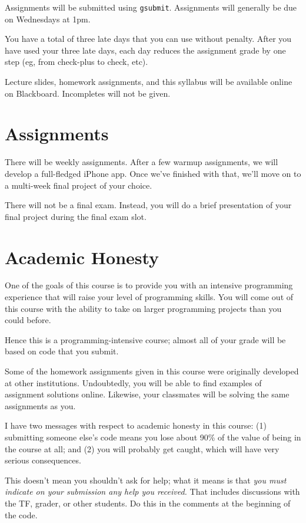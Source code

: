 \documentclass[11pt]{article}
\begin{document}
Assignments will be submitted using \texttt{gsubmit}.   Assignments will
generally be due on Wednesdays at 1pm.

You have a total of three late days that you can use without penalty.
After you have used your three late days, each day reduces the
assignment grade by one step (eg, from check-plus to check, etc).

\sloppypar
Lecture slides, homework assignments, and this syllabus will be available
online on Blackboard.  Incompletes will not be given. 

\section*{Assignments}

There will be weekly assignments.   After a few warmup assignments, we
will develop a full-fledged iPhone app.  Once we've finished with that,
we'll move on to a multi-week final project of your choice.

There will not be a final exam.  Instead, you will do a brief
presentation of your final project during the final exam slot.

\section*{Academic Honesty}
One of the goals of this course is to provide you with an intensive
programming experience that will raise your level of programming
skills.  You will come out of this course with the ability to take on
larger programming projects than you could before.  

Hence this is a programming-intensive course;  almost all of your grade will
be based on code that you submit.   

Some of the homework assignments given in this course were originally developed
at other institutions.  Undoubtedly, you will be able to find examples of
assignment solutions online.   Likewise, your classmates will be solving
the same assignments as you.

I have two messages with respect to academic honesty in this course: (1)
submitting someone else's code means you lose about 90\% of the value of
being in the course at all;  and (2) you will probably get caught, which
will have very serious consequences.

This doesn't mean you shouldn't ask for help;  what it means is that
\emph{you must indicate on your submission any help you received.}  That
includes discussions with the TF, grader, or other students.  Do this in
the comments at the beginning of the code.
\end{document}
